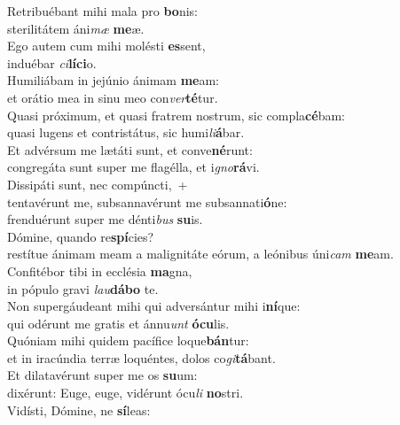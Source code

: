 \evenverse Retribuébant mihi mala pro \textbf{bo}nis:~\*\\
\evenverse sterilitátem áni\textit{mæ} \textbf{me}æ.\\
\oddverse Ego autem cum mihi molésti \textbf{es}sent,~\*\\
\oddverse induébar \textit{ci}\textbf{lí}\textbf{ci}o.\\
\evenverse Humiliábam in jejúnio ánimam \textbf{me}am:~\*\\
\evenverse et orátio mea in sinu meo con\textit{ver}\textbf{té}tur.\\
\oddverse Quasi próximum, et quasi fratrem nostrum, sic compla\textbf{cé}bam:~\*\\
\oddverse quasi lugens et contristátus, sic humi\textit{li}\textbf{á}bar.\\
\evenverse Et advérsum me lætáti sunt, et conve\textbf{né}runt:~\*\\
\evenverse congregáta sunt super me flagélla, et i\textit{gno}\textbf{rá}vi.\\
\oddverse Dissipáti sunt, nec compúncti,~+\\
\oddverse  tentavérunt me, subsannavérunt me subsannati\textbf{ó}ne:~\*\\
\oddverse frenduérunt super me dénti\textit{bus} \textbf{su}is.\\
\evenverse Dómine, quando re\textbf{spí}cies?~\*\\
\evenverse restítue ánimam meam a malignitáte eórum, a leónibus úni\textit{cam} \textbf{me}am.\\
\oddverse Confitébor tibi in ecclésia \textbf{ma}gna,~\*\\
\oddverse in pópulo gravi \textit{lau}\textbf{dá}\textbf{bo} te.\\
\evenverse Non supergáudeant mihi qui adversántur mihi i\textbf{ní}que:~\*\\
\evenverse qui odérunt me gratis et ánnu\textit{unt} \textbf{ó}\textbf{cu}lis.\\
\oddverse Quóniam mihi quidem pacífice loque\textbf{bán}tur:~\*\\
\oddverse et in iracúndia terræ loquéntes, dolos co\textit{gi}\textbf{tá}bant.\\
\evenverse Et dilatavérunt super me os \textbf{su}um:~\*\\
\evenverse dixérunt: Euge, euge, vidérunt ócu\textit{li} \textbf{no}stri.\\
\oddverse Vidísti, Dómine, ne \textbf{sí}leas:~\*\\
